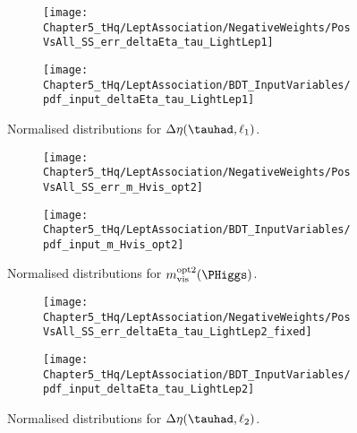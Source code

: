 \begin{figure}[h]
\centering
\begin{subfigure}{.46\textwidth}
  \centering
  \texttt{[image: Chapter5\_tHq/LeptAssociation/NegativeWeights/PosVsAll\_SS\_err\_deltaEta\_tau\_LightLep1]}
\end{subfigure}%
\begin{subfigure}{.46\textwidth}
  \centering
  \texttt{[image: Chapter5\_tHq/LeptAssociation/BDT\_InputVariables/pdf\_input\_deltaEta\_tau\_LightLep1]}
\end{subfigure}
\caption{Normalised distributions for $\Delta \eta(\tauhad, \ell_{1})$.}
\label{fig:Appendix:BDTVARS:LeptonAssignment:deltaEta_tau_LightLep1}
\end{figure}

\begin{figure}[h]
\centering
\begin{subfigure}{.46\textwidth}
  \centering
  \texttt{[image: Chapter5\_tHq/LeptAssociation/NegativeWeights/PosVsAll\_SS\_err\_m\_Hvis\_opt2]}
\end{subfigure}%
\begin{subfigure}{.46\textwidth}
  \centering
  \texttt{[image: Chapter5\_tHq/LeptAssociation/BDT\_InputVariables/pdf\_input\_m\_Hvis\_opt2]}
\end{subfigure}
\caption{Normalised distributions for $m^{\text{opt2}}_{\text{vis}}(\PHiggs)$.}
\label{fig:Appendix:BDTVARS:LeptonAssignment:m_Hvis_opt2}
\end{figure}

\begin{figure}[h]
\centering
\begin{subfigure}{.46\textwidth}
  \centering
  \texttt{[image: Chapter5\_tHq/LeptAssociation/NegativeWeights/PosVsAll\_SS\_err\_deltaEta\_tau\_LightLep2\_fixed]}
\end{subfigure}%
\begin{subfigure}{.46\textwidth}
  \centering
  \texttt{[image: Chapter5\_tHq/LeptAssociation/BDT\_InputVariables/pdf\_input\_deltaEta\_tau\_LightLep2]}
\end{subfigure}
\caption{Normalised distributions for $\Delta \eta(\tauhad, \ell_{2})$.}
\label{fig:Appendix:BDTVARS:LeptonAssignment:deltaEta_tau_LightLep2}
\end{figure}

